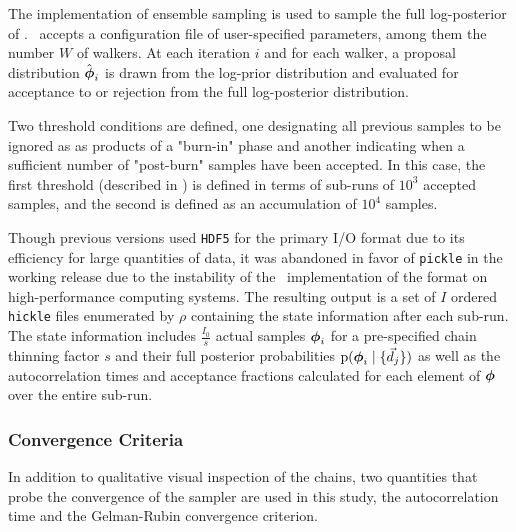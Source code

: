 The \emcee \citep{Foreman-Mackey2013} implementation of ensemble sampling is used to sample the full log-posterior of . 
\chippr\ accepts a configuration file of user-specified parameters, among them the number $W$ of walkers.
At each iteration $i$ and for each walker, a proposal distribution $\hat{{\boldsymbol{\phi}}}_{i}$ is drawn from the log-prior distribution and evaluated for acceptance to or rejection from the full log-posterior distribution.

Two threshold conditions are defined, one designating all previous samples to be ignored as as products of a "burn-in" phase and another indicating when a sufficient number of "post-burn" samples have been accepted.  
In this case, the first threshold (described in ) is defined in terms of sub-runs of $10^{3}$ accepted samples, and the second is defined as an accumulation of $10^{4}$ samples.

Though previous versions used \texttt{HDF5} for the primary I/O format due to its efficiency for large quantities of data, it was abandoned in favor of \texttt{pickle} in the working release due to the instability of the \python\ implementation of the format on high-performance computing systems.  
The resulting output is a set of $I$ ordered \texttt{hickle} files enumerated by $\rho$ containing the state information after each sub-run.  
The state information includes $\frac{I_{0}}{s}$ actual samples ${\boldsymbol{\phi}}_{i}$ for a pre-specified chain thinning factor $s$ and their full posterior probabilities $\mathrm{p}({\boldsymbol{\phi}}_{i} \mid \{\vec{d}_{j}\})$ as well as the autocorrelation times and acceptance fractions calculated for each element of ${\boldsymbol{\phi}}$ over the entire sub-run.  

\subsubsection{Convergence Criteria}

In addition to qualitative visual inspection of the chains, two quantities that probe the convergence of the sampler are used in this study, the autocorrelation time and the Gelman-Rubin convergence criterion.  


